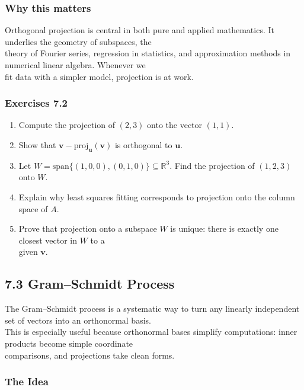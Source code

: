 \documentclass[
  12pt,
  a4paper,
]{article}
\begin{document}
\subsubsection{Why this matters}\label{why-this-matters-25}

Orthogonal projection is central in both pure and applied mathematics.
It underlies the geometry of subspaces, the\\
theory of Fourier series, regression in statistics, and approximation
methods in numerical linear algebra. Whenever we\\
fit data with a simpler model, projection is at work.

\subsubsection{Exercises 7.2}\label{exercises-72}

\begin{enumerate}
\def\labelenumi{\arabic{enumi}.}
\item
  Compute the projection of \((2,3)\) onto the vector \((1,1)\).
\item
  Show that \(\mathbf{v} - \text{proj}_{\mathbf{u}}(\mathbf{v})\) is
  orthogonal to \(\mathbf{u}\).
\item
  Let \(W = \text{span}\{(1,0,0), (0,1,0)\} \subseteq \mathbb{R}^3\).
  Find the projection of \((1,2,3)\) onto \(W\).
\item
  Explain why least squares fitting corresponds to projection onto the
  column space of \(A\).
\item
  Prove that projection onto a subspace \(W\) is unique: there is
  exactly one closest vector in \(W\) to a\\
  given \(\mathbf{v}\).
\end{enumerate}

\subsection{7.3 Gram--Schmidt Process}\label{73-gram--schmidt-process}

The Gram--Schmidt process is a systematic way to turn any linearly
independent set of vectors into an orthonormal basis.\\
This is especially useful because orthonormal bases simplify
computations: inner products become simple coordinate\\
comparisons, and projections take clean forms.

\subsubsection{The Idea}\label{the-idea}
\end{document}

